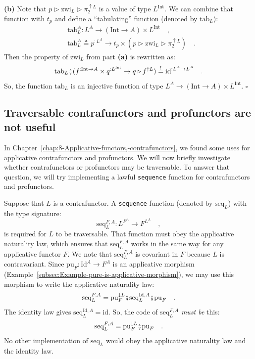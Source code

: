 \textbf{(b)} Note that $p\triangleright\text{zwi}_{L}\triangleright\pi_{2}^{\uparrow L}$
is a value of type $L^{\text{Int}}$. We can combine that function
with $t_{p}$ and define a \textsf{``}tabulating\textsf{''} function (denoted by $\text{tab}_{L}$):
\begin{align*}
 & \text{tab}_{L}^{A}:L^{A}\rightarrow(\text{Int}\rightarrow A)\times L^{\text{Int}}\quad,\\
 & \text{tab}_{L}^{A}\triangleq p^{:L^{A}}\rightarrow t_{p}\times(p\triangleright\text{zwi}_{L}\triangleright\pi_{2}^{\uparrow L})\quad.
\end{align*}
Then the property of $\text{zwi}_{L}$ from part \textbf{(a)} is rewritten
as:
\[
\text{tab}_{L}\bef(f^{:\text{Int}\rightarrow A}\times q^{:L^{\text{Int}}}\rightarrow q\triangleright f^{\uparrow L})\overset{!}{=}\text{id}^{:L^{A}\rightarrow L^{A}}\quad.
\]
So, the function $\text{tab}_{L}$ is an injective function of type
$L^{A}\rightarrow(\text{Int}\rightarrow A)\times L^{\text{Int}}$.
$\square$ 

\subsection{Traversable contrafunctors and profunctors are not useful}

In Chapter~\ref{chap:8-Applicative-functors,-contrafunctors}, we
found some uses for applicative contrafunctors and profunctors. We
will now briefly investigate whether contrafunctors or profunctors
may be traversable. To answer that question, we will try implementing
a lawful \lstinline!sequence! function for contrafunctors and profunctors.

Suppose that $L$ is a contrafunctor. A \lstinline!sequence! function
(denoted by $\text{seq}_{L}$) with the type signature:
\[
\text{seq}_{L}^{F,A}:L^{F^{A}}\rightarrow F^{L^{A}}\quad,
\]
is required for $L$ to be traversable. That function must obey the
applicative naturality law, which ensures that $\text{seq}_{L}^{F,A}$
works in the same way for any applicative functor $F$. We note that
$\text{seq}_{L}^{F,A}$ is covariant in $F$ because $L$ is contravariant.
Since $\text{pu}_{F}:\text{Id}^{A}\rightarrow F^{A}$ is an applicative
morphism (Example~\ref{subsec:Example-pure-is-applicative-morphism}),
we may use this morphism to write the applicative naturality law:
\[
\text{seq}_{L}^{F,A}=\text{pu}_{F}^{\downarrow L}\bef\text{seq}_{L}^{\text{Id},A}\bef\text{pu}_{F}\quad.
\]
The identity law gives $\text{seq}_{L}^{\text{Id},A}=\text{id}$.
So, the code of $\text{seq}_{L}^{F,A}$ \emph{must be} this:
\[
\text{seq}_{L}^{F,A}=\text{pu}_{F}^{\downarrow L}\bef\text{pu}_{F}\quad.
\]
No other implementation of $\text{seq}_{L}$ would obey the applicative
naturality law and the identity law.


